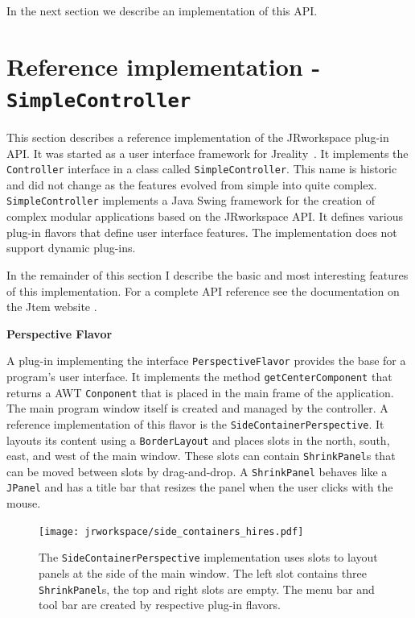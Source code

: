 \documentclass[Thesis.tex]{subfiles}
\begin{document}
In the next section we describe an implementation of this API.

\section{Reference implementation - {\tt SimpleController}}
\label{sec:reference_implementation}
This section describes a reference implementation of the {\sc JRworkspace} plug-in API.
It was started as a user interface framework for {\sc Jreality}~\cite{JrealityWebsite}. It implements
the {\tt Controller} interface in a class called {\tt SimpleController}. This name is historic
and did not change as the features evolved from simple into quite complex.
{\tt SimpleController} implements a {\sc Java Swing\TReg} framework for the creation of complex
modular applications based on the {\sc JRworkspace} API. It defines various plug-in flavors
that define user interface features. The implementation does not support dynamic plug-ins.

In the remainder of this section I describe the basic and most interesting features of this 
implementation. For a complete API reference see the documentation on the {\sc Jtem} website 
\cite{JtemWebsite}.


{\bf Perspective Flavor}

A plug-in implementing the interface {\tt PerspectiveFlavor} provides the base for a program's user 
interface. It implements the method {\tt getCenterComponent} that returns a AWT {\tt Conponent}
that is placed in the main frame of the application. The main program window itself is created and
managed by the controller.
A reference implementation of this flavor is the {\tt SideContainerPerspective}. It layouts its content 
using a {\tt BorderLayout} and places slots in the north, south, east, and west of the main window. These
slots can contain {\tt ShrinkPanel}s that can be moved between slots by drag-and-drop. A {\tt ShrinkPanel}
behaves like a {\tt JPanel} and has a title bar that resizes the panel when the user clicks with the mouse.

\begin{figure}[H]
\centering
\texttt{[image: jrworkspace/side\_containers\_hires.pdf]}
\caption[The {\tt SideContainerPerspective} user interface plug-in]{The {\tt SideContainerPerspective} implementation uses slots to layout panels at the side of the
main window. The left slot contains three {\tt ShrinkPanel}s, the top and right slots are empty. The menu bar 
and tool bar are created by respective plug-in flavors.}
\label{fig:side_containers}
\end{figure}
\end{document}
